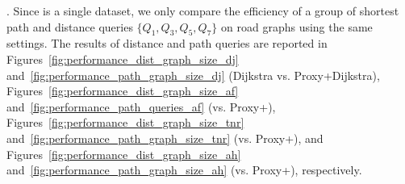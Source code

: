 


.
%
Since \dblpone is a single dataset, we only compare the efficiency of a group of shortest path and distance queries $\{Q_1, Q_3, Q_5, Q_7\}$  on road graphs using the same settings.
The results of distance and path queries are reported in
Figures~\ref{fig:performance_dist_graph_size_dj} and~\ref{fig:performance_path_graph_size_dj} (Dijkstra vs. Proxy+Dijkstra), Figures~\ref{fig:performance_dist_graph_size_af} and~\ref{fig:performance_path_queries_af} (\arcflag vs. Proxy+\arcflag), Figures~\ref{fig:performance_dist_graph_size_tnr} and~\ref{fig:performance_path_graph_size_tnr} (\tnr vs. Proxy+\tnr), and Figures~\ref{fig:performance_dist_graph_size_ah} and~\ref{fig:performance_path_graph_size_ah} (\ah vs. Proxy+\ah), respectively.








